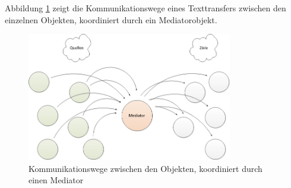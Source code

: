 Abbildung \ref{strukturiert} zeigt die Kommunikationswege eines Texttransfers zwischen den einzelnen Objekten, koordiniert durch ein Mediatorobjekt. 
\begin{figure}[htp!]
	\includegraphics[width=0.8\textwidth]{mediated}
	\caption{Kommunikationswege zwischen den Objekten, koordiniert durch einen Mediator}
	\label{strukturiert}
\end{figure}
